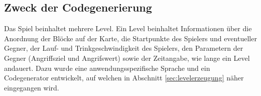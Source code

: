 \subsection{Zweck der Codegenerierung}

Das Spiel beinhaltet mehrere Level.
Ein Level beinhaltet Informationen über die Anordnung der Blöcke auf der Karte, die Startpunkte des Spielers und eventueller Gegner, der Lauf- und Trinkgeschwindigkeit des Spielers, den Parametern der Gegner (Angriffsziel und Angrifswert) sowie der Zeitangabe, wie lange ein Level andauert.
Dazu wurde eine anwendungsspezifische Sprache und ein Codegenerator entwickelt, auf welchen in Abschnitt \ref{sec:levelerzeugung} näher eingegangen wird.